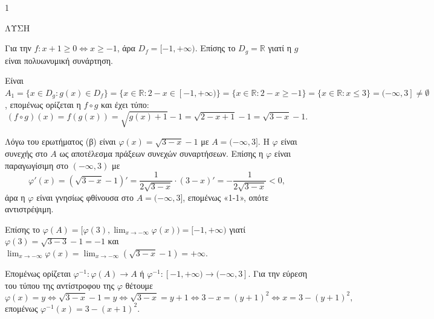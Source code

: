 \begin{ylh}{1}
    \item [Ύλη από εικόνα]
\end{ylh}
ΛΥΣΗ

\begin{alist}
\item Για την $f: x+1 \ge 0 \iff x \ge -1$, άρα $D_f = [-1, +\infty)$.
Επίσης το $D_g = \mathbb{R}$ γιατί η $g$ είναι πολυωνυμική συνάρτηση. 

\item Είναι $A_1 = \{x \in D_g : g(x) \in D_f\} = \{x \in \mathbb{R}: 2-x \in [-1, +\infty)\} = \{x \in \mathbb{R}: 2-x \ge -1\} = \{x \in \mathbb{R}: x \le 3\} = (-\infty, 3] \ne \emptyset$, επομένως ορίζεται η $f \circ g$ και έχει τύπο:
\[
(f \circ g)(x) = f(g(x)) = \sqrt{g(x)+1}-1 = \sqrt{2-x+1}-1 = \sqrt{3-x}-1.
\] 

\item Λόγω του ερωτήματος (β) είναι $\varphi(x)=\sqrt{3-x}-1$ με $A=(-\infty,3]$.
Η $\varphi$ είναι συνεχής στο $A$ ως αποτέλεσμα πράξεων συνεχών συναρτήσεων. Επίσης η $\varphi$ είναι παραγωγίσιμη στο $(-\infty,3)$ με
\[
\varphi'(x) = (\sqrt{3-x}-1)' = \frac{1}{2\sqrt{3-x}} \cdot (3-x)' = -\frac{1}{2\sqrt{3-x}} < 0,
\]
άρα η $\varphi$ είναι γνησίως φθίνουσα στο $A=(-\infty,3]$, επομένως «1-1», οπότε αντιστρέψιμη.

Επίσης το $\varphi(A)=[\varphi(3), \lim_{x \to -\infty} \varphi(x)) = [-1, +\infty)$
γιατί $\varphi(3) = \sqrt{3-3}-1 = -1$ και $\lim_{x \to -\infty} \varphi(x) = \lim_{x \to -\infty} (\sqrt{3-x}-1) = +\infty$.

Επομένως ορίζεται $\varphi^{-1} : \varphi(A) \to A$ ή $\varphi^{-1} : [-1, +\infty) \to (-\infty,3]$.
Για την εύρεση του τύπου της αντίστροφου της $\varphi$ θέτουμε
\[
\varphi(x)=y \iff \sqrt{3-x}-1=y \iff \sqrt{3-x}=y+1 \iff 3-x=(y+1)^2 \iff x=3-(y+1)^2,
\]
επομένως $\varphi^{-1}(x)=3-(x+1)^2$. 
\end{alist}